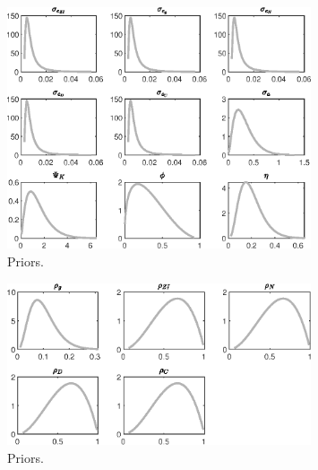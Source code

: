  
\begin{figure}[H]
\centering
\includegraphics[width=0.80\textwidth]{BRS_growth_ext_comovement/graphs/BRS_growth_ext_comovement_Priors1}
\caption{Priors.}\label{Fig:Priors:1}
\end{figure}
\begin{figure}[H]
\centering
\includegraphics[width=0.80\textwidth]{BRS_growth_ext_comovement/graphs/BRS_growth_ext_comovement_Priors2}
\caption{Priors.}\label{Fig:Priors:2}
\end{figure}
 
